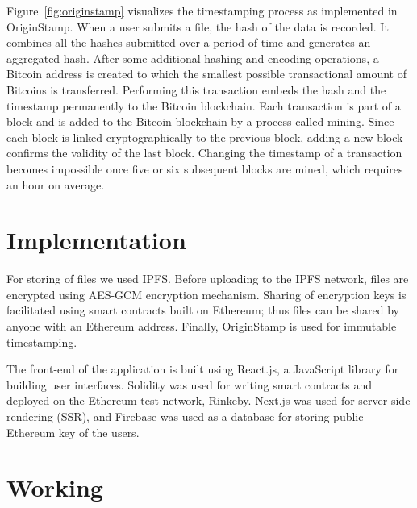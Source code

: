 Figure~\ref{fig:originstamp} visualizes the timestamping process as implemented in OriginStamp. When a user submits a file, the hash of the data is recorded. It combines all the hashes submitted over a period of time and generates an aggregated hash. After some additional hashing and encoding operations, a Bitcoin address is created to which the smallest possible transactional amount of Bitcoins is transferred. Performing this transaction embeds the hash and the timestamp permanently to the Bitcoin blockchain. Each transaction is part of a block and is added to the Bitcoin blockchain by a process called mining. Since each block is linked cryptographically to the previous block, adding a new block confirms the validity of the last block. Changing the timestamp of a transaction becomes impossible once five or six subsequent blocks are mined, which requires an hour on average\cite{nakamoto2008bitcoin}.

\section{Implementation}
For storing of files we used IPFS. Before uploading to the IPFS network, files are encrypted using AES-GCM encryption mechanism. Sharing of encryption keys is facilitated using smart contracts built on Ethereum; thus files can be shared by anyone with an Ethereum address. Finally, OriginStamp is used for immutable timestamping.

The front-end of the application is built using React.js, a JavaScript library for building user interfaces. Solidity was used for writing smart contracts and deployed on the Ethereum test network, Rinkeby. Next.js was used for server-side rendering (SSR), and Firebase was used as a database for storing public Ethereum key of the users.

\section{Working}